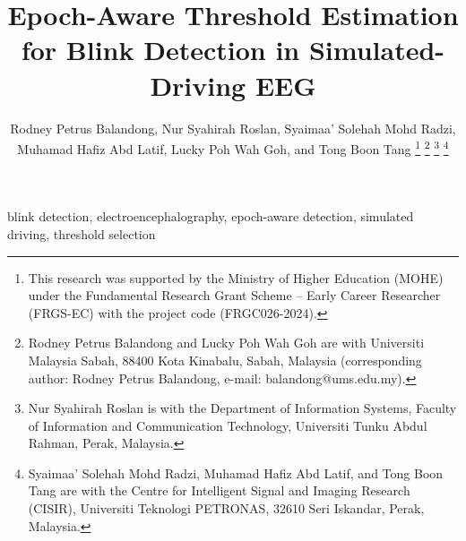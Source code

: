 \documentclass[journal,twoside,web]{ieeecolor}
\begin{document}
\title{Epoch-Aware Threshold Estimation for Blink Detection in Simulated-Driving EEG}


\author{Rodney Petrus Balandong, Nur Syahirah Roslan, Syaimaa' Solehah Mohd Radzi,
Muhamad Hafiz Abd Latif,
    Lucky Poh Wah Goh,
    and Tong Boon Tang
\thanks{This research was supported by the Ministry of Higher Education (MOHE)
under the Fundamental Research Grant Scheme -- Early Career Researcher
(FRGS-EC) with the project code (FRGC026-2024).}
\thanks{Rodney Petrus Balandong and Lucky Poh Wah Goh are with
Universiti Malaysia Sabah, 88400 Kota Kinabalu, Sabah, Malaysia
(corresponding author: Rodney Petrus Balandong, e-mail: balandong@ums.edu.my).}
\thanks{Nur Syahirah Roslan is with the Department of Information Systems,
Faculty of Information and Communication Technology, Universiti Tunku Abdul
Rahman, Perak, Malaysia.}
\thanks{Syaimaa' Solehah Mohd Radzi, Muhamad Hafiz Abd Latif, and Tong Boon
Tang are with the Centre for Intelligent Signal and Imaging Research (CISIR),
Universiti Teknologi PETRONAS, 32610 Seri Iskandar, Perak, Malaysia.}}

\maketitle



\begin{IEEEkeywords}
blink detection, electroencephalography, epoch-aware detection, simulated
driving, threshold selection
\end{IEEEkeywords}








\makeatletter
{}
\makeatother


\clearpage
\makeatletter
{}
\makeatother
\appendices


\makeatletter
{}
\makeatother
\end{document}
